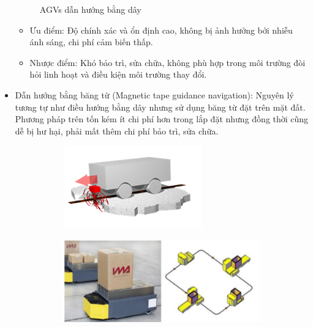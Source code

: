 \begin{itemize}
\begin{figure}[H]
\begin{subfigure}{0.5\textwidth}
                \label{chap1_pic5b}
                \end{subfigure}
                \caption{AGVs dẫn hướng bằng dây}
                \label{chap1_pic5}
            \end{figure}
        \begin{itemize}[label=\textendash]
            \item Ưu điểm: Độ chính xác và ổn định cao, không bị ảnh hưởng bởi nhiễu ánh sáng, chi phí cảm biến thấp.
            \item Nhược điểm: Khó bảo trì, sửa chữa, không phù hợp trong môi trường đòi hỏi linh hoạt và điều kiện môi trường thay đổi. 
        \end{itemize}
        \item Dẫn hướng bằng băng từ (Magnetic tape guidance navigation): Nguyên lý tương tự như điều hướng bằng dây nhưng sử dụng băng
        từ đặt trên mặt đất. Phương pháp trên tốn kém ít chi phí hơn trong lắp đặt nhưng đồng thời cũng dễ bị hư hại, phải mất thêm chi phí bảo trì, sửa chữa.
            \begin{figure}[H]
                \begin{subfigure}{0.5\textwidth}
                \centering
                \includegraphics[width=0.6\linewidth, right]{pictures/chapter1/chapter1_pic_6a.png} 
                \label{chap1_pic6a}
                \end{subfigure}
                \begin{subfigure}{0.7\textwidth}
                \includegraphics[width=0.7\linewidth]{pictures/chapter1/chapter1_pic_6b.png}
                \label{chap1_pic6b}
                \end{subfigure}

\end{figure}
\end{itemize}
